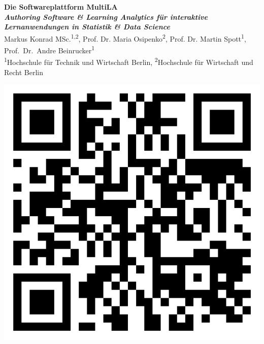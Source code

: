 \documentclass[a0,portrait]{a0poster}
\begin{document}


\begin{minipage}[b]{0.75\linewidth}
\veryHuge \color{NavyBlue} \textbf{Die Softwareplattform MultiLA}\\[0.4cm] %
\Huge\textbf{\textit{Authoring Software \& Learning Analytics für interaktive \mbox{Lernanwendungen} in Statistik \& Data Science}}\\[2cm] %
\color{Black}
\huge Markus Konrad MSc.\textsuperscript{1,2},
Prof. Dr. Maria Osipenko\textsuperscript{2},
Prof. Dr. Martin Spott\textsuperscript{1},
Prof.~Dr.~Andre Beinrucker\textsuperscript{1}\\[0.7cm] %
\large \textsuperscript{1}Hochschule für Technik und Wirtschaft Berlin, \textsuperscript{2}Hochschule für Wirtschaft und Recht Berlin\\[0.4cm] %
\end{minipage}
%
\begin{minipage}[b]{0.25\linewidth}
\includegraphics[width=15cm,right]{qrcode.png}
\end{minipage}
\end{document}
